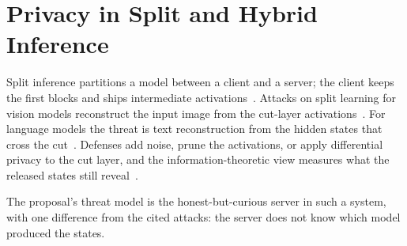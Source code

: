 \section{Privacy in Split and Hybrid Inference}\label{sec:lit:split}

Split inference partitions a model between a client and a server; the client keeps the first blocks and ships intermediate activations~. Attacks on split learning for vision models reconstruct the input image from the cut-layer activations~. For language models the threat is text reconstruction from the hidden states that cross the cut~. Defenses add noise, prune the activations, or apply differential privacy to the cut layer, and the information-theoretic view measures what the released states still reveal~.

The proposal's threat model is the honest-but-curious server in such a system, with one difference from the cited attacks: the server does not know which model produced the states.

